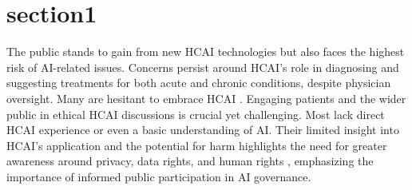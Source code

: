 \documentclass[paper=a4, fontsize=11pt]{scrartcl} %
\numberwithin{equation}{section} %
\numberwithin{figure}{section} %
\numberwithin{table}{section} %
\begin{document}
\section{section1}

The public stands to gain from new HCAI technologies but also faces the highest risk of 
AI-related issues. Concerns persist around HCAI's role in diagnosing and suggesting treatments 
for both acute and chronic conditions, despite physician oversight. Many are hesitant to embrace HCAI \cite{esmaeilzadehPatientsPerceptionsHuman2021}. 
Engaging patients and the wider public in ethical HCAI discussions is crucial yet challenging. 
Most lack direct HCAI experience or even a basic understanding of AI. Their limited insight into HCAI's 
application and the potential for harm highlights the need for greater awareness around privacy, data rights, 
and human rights \cite{frostPublicViewsEthical2022}, emphasizing the importance of informed public participation in AI governance.
\end{document}
